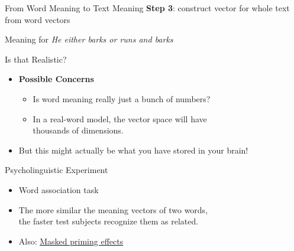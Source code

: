 \documentclass[professionalfonts, xcolor={usenames,svgnames,x11names,table}]{beamer}
\begin{document}
\begin{frame}{From Word Meaning to Text Meaning}
    \textbf{Step 3}: construct vector for whole text from word vectors

    \begin{exampleblock}{Meaning for \emph{He either barks or runs and barks}}
        \centering
    \end{exampleblock}
\end{frame}

\begin{frame}{Is that Realistic?}
    \begin{itemize}
        \item \textbf{Possible Concerns}
            \begin{itemize}
                \item Is word meaning really just a bunch of numbers?
                \item In a real-word model, the vector space will have\\
                    thousands of dimensions.
            \end{itemize}
        \item But this might actually be what you have stored in your brain!
    \end{itemize}
    \begin{block}{Psycholinguistic Experiment}
        \begin{itemize}
            \item Word association task
            \item The more similar the meaning vectors of two words,\\
                the faster test subjects recognize them as related.
               \item Also: \href{http://www.u.arizona.edu/~kforster/priming/index.htm}{Masked priming effects}
        \end{itemize}
    \end{block}
\end{frame}
\end{document}
